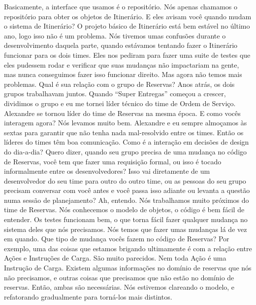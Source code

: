 \documentclass[12pt,play]{article}
\begin{document}
\julian Basicamente, a interface que usamos é o repositório. Nós apenas chamamos o repositório para obter os objetos de Itinerário.
\dani E eles avisam você quando mudam o sistema de Itinerário?
\julian O projeto básico de Itinerário está bem estável no último ano, logo isso não é um problema. Nós tivemos umas confusões durante o desenvolvimento daquela parte, quando estávamos tentando fazer o Itinerário funcionar para os dois times. Eles nos pediram para fazer uma suite de testes que eles pudessem rodar e verificar que suas mudanças não impactariam na gente, mas nunca conseguimos fazer isso funcionar direito. Mas agora não temos mais problemas.
\dani Qual é sua relação com o grupo de Reservas?
\julian Anos atrás, os dois grupos trabalhavam juntos. Quando ``Super Entregas'' começou a crescer, dividimos o grupo e eu me tornei líder técnico do time de Ordem de Serviço. Alexandre se tornou líder do time de Reservas na mesma época.
\dani E como vocês interagem agora?
\julian Nós levamos muito bem. Alexandre e eu sempre almoçamos às sextas para garantir que não tenha nada mal-resolvido entre os times.
\dani Então os líderes do times têm boa comunicação. Como é a interação em decisões de design do dia-a-dia? Quero dizer, quando seu grupo precisa de uma mudança no código de Reservas, você tem que fazer uma requisição formal, ou isso é tocado informalmente entre os desenvolvedores? Isso vai diretamente de um desenvolvedor do seu time para outro do outro time, ou as pessoas do seu grupo precisam conversar com você antes e você passa isso adiante ou levanta a questão numa sessão de planejamento?
\julian Ah, entendo. Nós trabalhamos muito próximos do time de Reservas. Nós conhecemos o modelo de objetos, o código é bem fácil de entender. Os testes funcionam bem, o que torna fácil fazer qualquer mudança no sistema deles que nós precisamos. Nós temos que fazer umas mudanças lá de vez em quando.
\dani Que tipo de mudança vocês fazem no código de Reservas?
\julian Por exemplo, uma das coisas que estamos brigando ultimamente é com a relação entre Ações e Instruções de Carga. São muito parecidos. Nem toda Ação é uma Instrução de Carga. Existem algumas informações no domínio de reservas que nós não precisamos, e outras coisas que precisamos que não estão no domínio de reservas. Então, ambas são necessárias. Nós estivemos clareando o modelo, e refatorando gradualmente para torná-los mais distintos.

\narr {}
\end{document}
